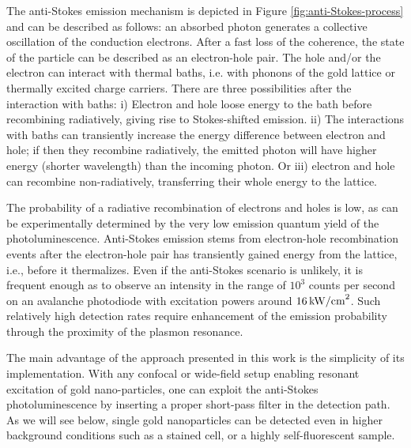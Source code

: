 The anti-Stokes emission mechanism\cite{He2015} is depicted in Figure
\ref{fig:anti-Stokes-process} and can be described as follows: an absorbed
photon generates a collective oscillation of the conduction electrons. After a
fast loss of the coherence\cite{Sonnichsen2002}, the state of the particle can
be described as an electron-hole pair. The hole and/or the electron can interact
with thermal baths, i.e. with phonons of the gold lattice\cite{Lin2008} or
thermally excited charge carriers\cite{Sun1994}. There are three possibilities
after the interaction with baths: i) Electron and hole loose energy to the bath
before recombining radiatively, giving rise to Stokes-shifted emission.
ii) The interactions with baths can transiently increase the energy difference
between electron and hole; if then they recombine radiatively, the emitted
photon will have higher energy (shorter wavelength) than the incoming
photon\cite{Huang2014}. Or iii) electron and hole can recombine non-radiatively,
transferring their whole energy to the lattice.

\begin{sloppypar}
The probability of a radiative recombination of electrons and holes is low, as
can be experimentally determined by the very low emission quantum yield of the
photoluminescence\cite{Yorulmaz2012,Rao2015,Sonnichsen2002}. Anti-Stokes
emission stems from electron-hole recombination events after the electron-hole
pair has transiently gained energy from the lattice, i.e., before it
thermalizes. Even if the anti-Stokes scenario is unlikely, it is frequent enough
as to observe an intensity in the range of $10^3$ counts per second on an
avalanche photodiode with excitation powers around $16\,\textrm{kW/cm}^2$. Such relatively
high detection rates require enhancement of the emission probability through the
proximity of the plasmon resonance\cite{Neupane2013}.
\end{sloppypar}

The main advantage of the approach presented in this work is the simplicity of
its implementation. With any confocal or wide-field setup enabling resonant
excitation of gold nano-particles, one can exploit the anti-Stokes
photoluminescence by inserting a proper short-pass filter in the detection path.
As we will see below, single gold nanoparticles can be detected even in higher
background conditions such as a stained cell, or a highly self-fluorescent
sample.


